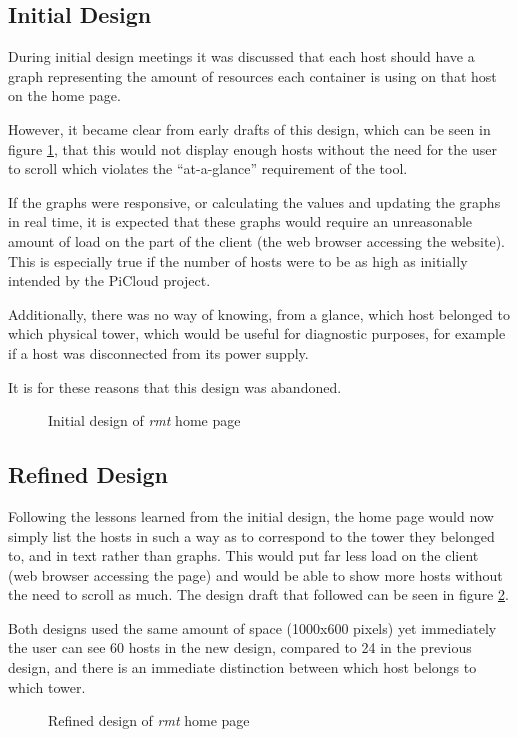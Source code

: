 \subsection{Initial Design}
During initial design meetings it was discussed that each host should have a graph representing the amount of resources each container is using on that host on the home page.

However, it became clear from early drafts of this design, which can be seen in figure \ref{fig:initialDesign}, that this would not display enough hosts without the need for the user to scroll which violates the ``at-a-glance'' requirement of the tool.

If the graphs were responsive, or calculating the values and updating the graphs in real time, it is expected that these graphs would require an unreasonable amount of load on the part of the client (the web browser accessing the website).
This is especially true if the number of hosts were to be as high as initially intended by the PiCloud project.

Additionally, there was no way of knowing, from a glance, which host belonged to which physical tower, which would be useful for diagnostic purposes, for example if a host was disconnected from its power supply. 

It is for these reasons that this design was abandoned.

\begin{figure}[t]
	\centering
	\setlength\fboxsep{0pt}
	\setlength\fboxrule{0.5pt}
	\caption{Initial design of \emph{rmt} home page}
	\label{fig:initialDesign}
\end{figure}

\subsection{Refined Design}

Following the lessons learned from the initial design, the home page would now simply list the hosts in such a way as to correspond to the tower they belonged to, and in text rather than graphs.
This would put far less load on the client (web browser accessing the page) and would be able to show more hosts without the need to scroll as much.
The design draft that followed can be seen in figure \ref{fig:refinedDesign}.

Both designs used the same amount of space (1000x600 pixels) yet immediately the user can see 60 hosts in the new design, compared to 24 in the previous design, and there is an immediate distinction between which host belongs to which tower.

\begin{figure}[t]
	\centering
	\setlength\fboxsep{0pt}
	\setlength\fboxrule{0.5pt}
	\caption{Refined design of \emph{rmt} home page}
	\label{fig:refinedDesign}
\end{figure}